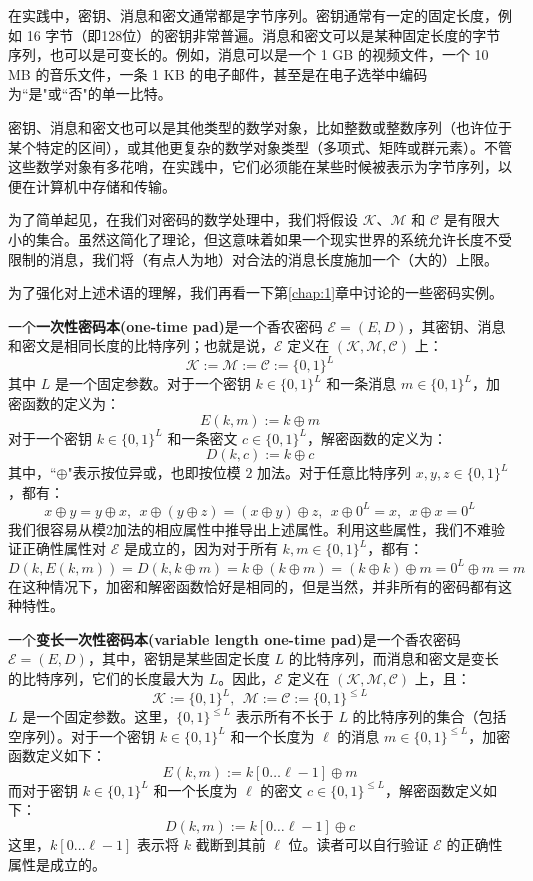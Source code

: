 在实践中，密钥、消息和密文通常都是字节序列。密钥通常有一定的固定长度，例如 16 字节（即128位）的密钥非常普遍。消息和密文可以是某种固定长度的字节序列，也可以是可变长的。例如，消息可以是一个 1 GB 的视频文件，一个 10 MB 的音乐文件，一条 1 KB 的电子邮件，甚至是在电子选举中编码为``是"或``否"的单一比特。

密钥、消息和密文也可以是其他类型的数学对象，比如整数或整数序列（也许位于某个特定的区间），或其他更复杂的数学对象类型（多项式、矩阵或群元素）。不管这些数学对象有多花哨，在实践中，它们必须能在某些时候被表示为字节序列，以便在计算机中存储和传输。

为了简单起见，在我们对密码的数学处理中，我们将假设 $\mathcal{K}$、$\mathcal{M}$ 和 $\mathcal{C}$ 是有限大小的集合。虽然这简化了理论，但这意味着如果一个现实世界的系统允许长度不受限制的消息，我们将（有点人为地）对合法的消息长度施加一个（大的）上限。

为了强化对上述术语的理解，我们再看一下第\ref{chap:1}章中讨论的一些密码实例。

\begin{example}\label{exmp:2-1}
一个\textbf{一次性密码本(one-time pad)}是一个香农密码 $\mathcal{E}=(E,D)$，其密钥、消息和密文是相同长度的比特序列；也就是说，$\mathcal{E}$ 定义在 $(\mathcal{K},\mathcal{M},\mathcal{C})$ 上：
$$
\mathcal{K}:=\mathcal{M}:=\mathcal{C}:=\{0,1\}^L
$$
其中 $L$ 是一个固定参数。对于一个密钥 $k\in\{0,1\}^L$ 和一条消息 $m\in\{0,1\}^L$，加密函数的定义为：
$$
E(k,m):=k\oplus m
$$
对于一个密钥 $k\in\{0,1\}^L$ 和一条密文 $c\in\{0,1\}^L$，解密函数的定义为：
$$
D(k,c):=k\oplus c
$$
其中，``$\oplus$"表示按位异或，也即按位模 $2$ 加法。对于任意比特序列 $x,y,z\in\{0,1\}^L$，都有：
$$
x\oplus y=y\oplus x,~~
x\oplus (y\oplus z)=(x\oplus y)\oplus z,~~
x\oplus 0^L =x,~~
x\oplus x =0^L
$$
我们很容易从模2加法的相应属性中推导出上述属性。利用这些属性，我们不难验证正确性属性对 $\mathcal{E}$ 是成立的，因为对于所有 $k,m\in\{0,1\}^L$，都有：
$$
D(k,E(k,m))=D(k,k\oplus m)=k\oplus (k\oplus m)=(k\oplus k)\oplus m=0^L\oplus m=m
$$
在这种情况下，加密和解密函数恰好是相同的，但是当然，并非所有的密码都有这种特性。
\end{example}

\begin{example}\label{exmp:2-2}
一个\textbf{变长一次性密码本(variable length one-time pad)}是一个香农密码 $\mathcal{E}=(E,D)$，其中，密钥是某些固定长度 $L$ 的比特序列，而消息和密文是变长的比特序列，它们的长度最大为 $L$。因此，$\mathcal{E}$ 定义在 $(\mathcal{K},\mathcal{M},\mathcal{C})$ 上，且：
$$
\mathcal{K}:=\{0,1\}^L,~~
\mathcal{M}:=\mathcal{C}:=\{0,1\}^{\leq L}
$$
$L$ 是一个固定参数。这里，$\{0,1\}^{\leq L}$ 表示所有不长于 $L$ 的比特序列的集合（包括空序列）。对于一个密钥 $k\in\{0,1\}^L$ 和一个长度为 $\ell$ 的消息 $m\in\{0,1\}^{\leq L}$，加密函数定义如下：
$$
E(k,m):=k[0\dots\ell-1]\oplus m
$$
而对于密钥 $k\in\{0,1\}^L$ 和一个长度为 $\ell$ 的密文 $c\in\{0,1\}^{\leq L}$，解密函数定义如下：
$$
D(k,m):=k[0\dots\ell-1]\oplus c
$$
这里，$k[0\dots\ell-1]$ 表示将 $k$ 截断到其前 $\ell$ 位。读者可以自行验证 $\mathcal{E}$ 的正确性属性是成立的。
\end{example}

